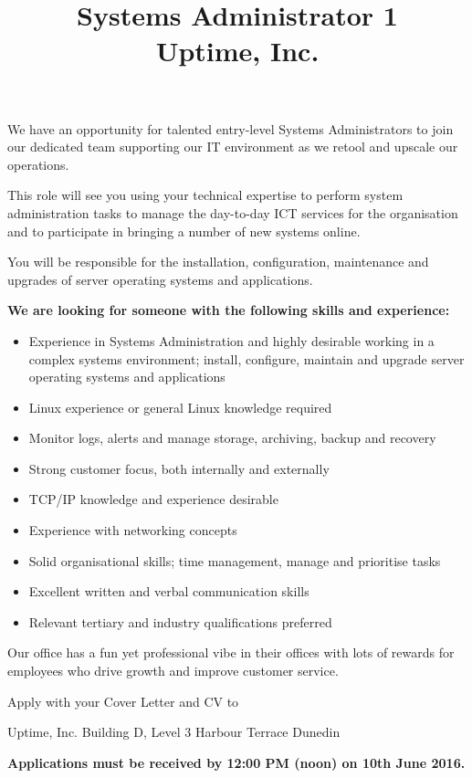 \documentclass{article}   	%
\title{Systems Administrator 1\\Uptime, Inc.}
\begin{document}
\maketitle
We have an opportunity for talented entry-level Systems Administrators to join our dedicated team supporting our IT environment as we retool and upscale our operations.
 
This role will see you using your technical expertise to perform system administration tasks to manage the day-to-day ICT services for the organisation and to participate in bringing a number of new systems online.
 
You will be responsible for the installation, configuration, maintenance and upgrades of server operating systems and applications.
 

\textbf{We are looking for someone with the following skills and experience:}
\begin{itemize}
\item Experience in Systems Administration and highly desirable working in a complex systems environment; install, configure, maintain and upgrade server operating systems and applications
\item Linux experience or general Linux knowledge required
\item Monitor logs, alerts and manage storage, archiving, backup and recovery
\item Strong customer focus, both internally and externally  
\item TCP/IP knowledge and experience desirable
\item Experience with networking concepts
\item Solid organisational skills; time management, manage and prioritise tasks
\item Excellent written and verbal communication skills
\item Relevant tertiary and industry qualifications preferred
\end{itemize}

Our office has a fun yet professional vibe in their offices with lots of rewards for employees who drive growth and improve customer service.
 
Apply with your Cover Letter and CV to


Uptime, Inc.
Building D, Level 3
Harbour Terrace
Dunedin

\textbf{Applications must be received by 12:00 PM (noon) on 10th June 2016.}
\end{document}
